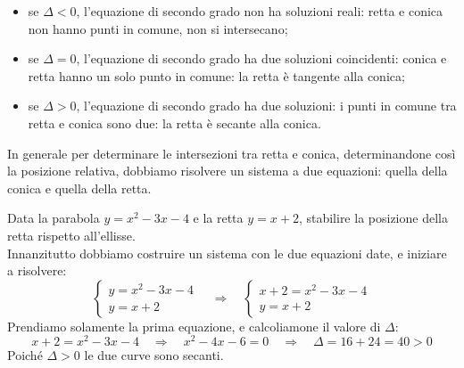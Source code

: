 \begin{itemize} [noitemsep]
  \item se \(\Delta<0\), l'equazione di secondo grado non ha soluzioni 
reali: retta e conica non hanno punti in comune, non si intersecano;
  \item se \(\Delta=0\), l'equazione di secondo grado ha due soluzioni coincidenti: conica e retta hanno un solo 
punto in comune: la retta è tangente alla conica;
  \item se \(\Delta>0\), l'equazione di secondo grado ha due soluzioni:
  i punti in comune tra retta e conica sono due: la retta è 
secante alla conica.
\end{itemize}

In generale per determinare le intersezioni tra retta e conica, 
determinandone così la posizione relativa, 
dobbiamo risolvere un sistema a due equazioni: quella della conica e quella 
della retta. 

\begin{esempio} Data la parabola \( y = x^2-3x-4\) e la retta \(y=x+2\), stabilire la posizione della retta 
rispetto all'ellisse.
\\[7pt]
Innanzitutto dobbiamo costruire un sistema con le due equazioni date, e iniziare a risolvere:
\[\begin{cases} y =x^2-3x-4 \\ y=x+2\end{cases} \quad \Rightarrow \quad \begin{cases} x+2 =x^2-3x-4 \\ y=x+2\end{cases}\]
Prendiamo solamente la prima equazione, e calcoliamone il valore di \(\Delta\):
\[x+2 =x^2-3x-4 \quad \Rightarrow \quad x^2-4x-6=0 \quad \Rightarrow \quad \Delta = 16+24=40>0\]
Poiché \(\Delta>0\) le due curve sono secanti.
\end{esempio}


